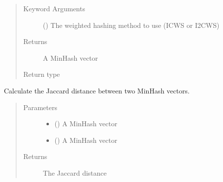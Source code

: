 \documentclass[letterpaper,10pt,english]{sphinxmanual}
\begin{document}
\begin{fulllineitems}
\begin{fulllineitems}
\begin{quote}
\begin{description}
\item[{Keyword Arguments}] \leavevmode
{} () \textendash{} The weighted hashing method to use (ICWS or I2CWS)

\item[{Returns}] \leavevmode
A MinHash vector

\item[{Return type}] \leavevmode
{}

\end{description}\end{quote}

\end{fulllineitems}


\begin{fulllineitems}
\label{\detokenize{documentation:tmap.Minhash.get_distance}}
Calculate the Jaccard distance between two MinHash vectors.
\begin{quote}\begin{description}
\item[{Parameters}] \leavevmode\begin{itemize}
\item {} 
 () \textendash{} A MinHash vector

\item {} 
 () \textendash{} A MinHash vector

\end{itemize}

\item[{Returns}] \leavevmode
{} The Jaccard distance

\end{description}\end{quote}

\end{fulllineitems}



\end{fulllineitems}
\end{document}

